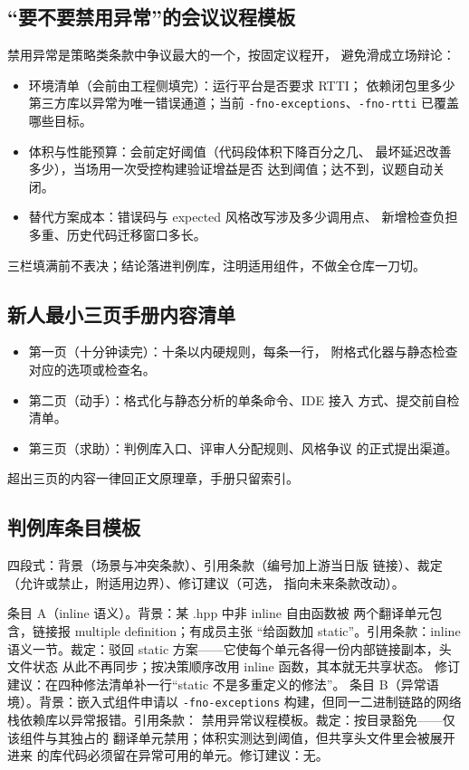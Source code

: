 \documentclass[12pt,a4paper,fontset=fandol]{ctexbook}
\newcommand{\Tp}[1]{\texttt{#1}}
\begin{document}
\subsection{``要不要禁用异常''的会议议程模板}

禁用异常是策略类条款中争议最大的一个，按固定议程开，
避免滑成立场辩论：

\begin{itemize}
\item 环境清单（会前由工程侧填完）：运行平台是否要求 RTTI；
      依赖闭包里多少第三方库以异常为唯一错误通道；当前
      \Tp{-fno-exceptions}、\Tp{-fno-rtti} 已覆盖哪些目标。
\item 体积与性能预算：会前定好阈值（代码段体积下降百分之几、
      最坏延迟改善多少），当场用一次受控构建验证增益是否
      达到阈值；达不到，议题自动关闭。
\item 替代方案成本：错误码与 expected 风格改写涉及多少调用点、
      新增检查负担多重、历史代码迁移窗口多长。
\end{itemize}

三栏填满前不表决；结论落进判例库，注明适用组件，不做全仓库一刀切。

\subsection{新人最小三页手册内容清单}

\begin{itemize}
\item 第一页（十分钟读完）：十条以内硬规则，每条一行，
      附格式化器与静态检查对应的选项或检查名。
\item 第二页（动手）：格式化与静态分析的单条命令、IDE 接入
      方式、提交前自检清单。
\item 第三页（求助）：判例库入口、评审人分配规则、风格争议
      的正式提出渠道。
\end{itemize}

超出三页的内容一律回正文原理章，手册只留索引。

\subsection{判例库条目模板}

四段式：背景（场景与冲突条款）、引用条款（编号加上游当日版
链接）、裁定（允许或禁止，附适用边界）、修订建议（可选，
指向未来条款改动）。

\begin{note}[title={两个示范条目}]
条目 A（inline 语义）。背景：某 .hpp 中非 inline 自由函数被
两个翻译单元包含，链接报 multiple definition；有成员主张
``给函数加 static''。引用条款：inline 语义一节。裁定：驳回
static 方案——它使每个单元各得一份内部链接副本，头文件状态
从此不再同步；按决策顺序改用 inline 函数，其本就无共享状态。
修订建议：在四种修法清单补一行``static 不是多重定义的修法''。
条目 B（异常语境）。背景：嵌入式组件申请以 \Tp{-fno-exceptions}
构建，但同一二进制链路的网络栈依赖库以异常报错。引用条款：
禁用异常议程模板。裁定：按目录豁免——仅该组件与其独占的
翻译单元禁用；体积实测达到阈值，但共享头文件里会被展开进来
的库代码必须留在异常可用的单元。修订建议：无。
\end{note}
\end{document}
